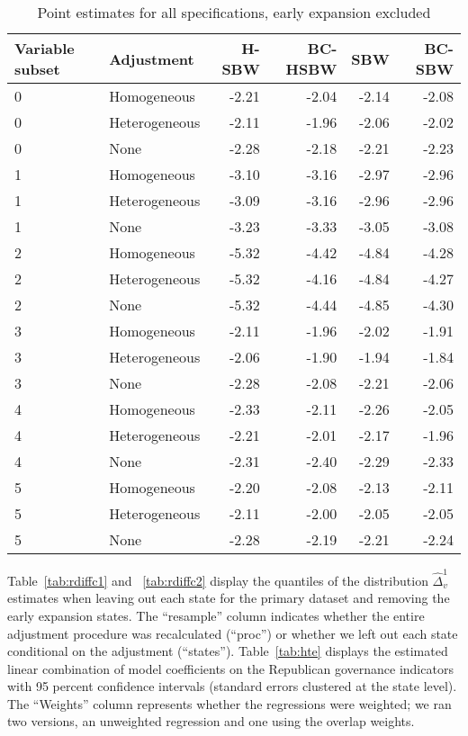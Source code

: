 \begin{table}[ht]
\centering
   \caption{Point estimates for all specifications, early expansion excluded}
    \label{tab:secondaryptests}
\begin{tabular}{llrrrr}
  \hline
Variable subset & Adjustment & H-SBW & BC-HSBW & SBW & BC-SBW \\ 
  \hline
0 & Homogeneous & -2.21 & -2.04 & -2.14 & -2.08 \\ 
  0 & Heterogeneous & -2.11 & -1.96 & -2.06 & -2.02 \\ 
  0 & None & -2.28 & -2.18 & -2.21 & -2.23 \\ 
  1 & Homogeneous & -3.10 & -3.16 & -2.97 & -2.96 \\ 
  1 & Heterogeneous & -3.09 & -3.16 & -2.96 & -2.96 \\ 
  1 & None & -3.23 & -3.33 & -3.05 & -3.08 \\ 
  2 & Homogeneous & -5.32 & -4.42 & -4.84 & -4.28 \\ 
  2 & Heterogeneous & -5.32 & -4.16 & -4.84 & -4.27 \\ 
  2 & None & -5.32 & -4.44 & -4.85 & -4.30 \\ 
  3 & Homogeneous & -2.11 & -1.96 & -2.02 & -1.91 \\ 
  3 & Heterogeneous & -2.06 & -1.90 & -1.94 & -1.84 \\ 
  3 & None & -2.28 & -2.08 & -2.21 & -2.06 \\ 
  4 & Homogeneous & -2.33 & -2.11 & -2.26 & -2.05 \\ 
  4 & Heterogeneous & -2.21 & -2.01 & -2.17 & -1.96 \\ 
  4 & None & -2.31 & -2.40 & -2.29 & -2.33 \\ 
  5 & Homogeneous & -2.20 & -2.08 & -2.13 & -2.11 \\ 
  5 & Heterogeneous & -2.11 & -2.00 & -2.05 & -2.05 \\ 
  5 & None & -2.28 & -2.19 & -2.21 & -2.24 \\ 
   \hline
\end{tabular}
\end{table}

Table~\ref{tab:rdiffc1} and ~\ref{tab:rdiffc2} display the quantiles of the distribution $\hat{\Delta}_v^1$ estimates when leaving out each state for the primary dataset and removing the early expansion states. The ``resample'' column indicates whether the entire adjustment procedure was recalculated (``proc'') or whether we left out each state conditional on the adjustment (``states''). Table~\ref{tab:hte} displays the estimated linear combination of model coefficients on the Republican governance indicators with 95 percent confidence intervals (standard errors clustered at the state level). The ``Weights'' column represents whether the regressions were weighted; we ran two versions, an unweighted regression and one using the overlap weights.

